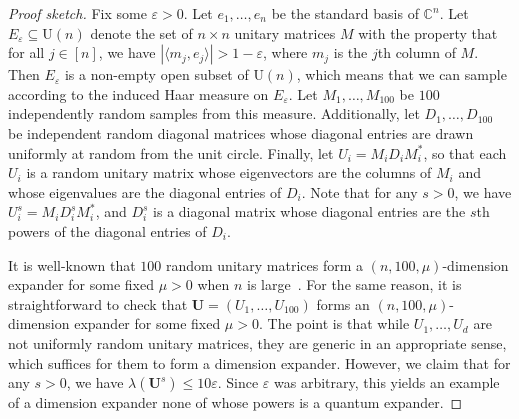 \documentclass[11pt]{article}
\theoremstyle{plain}
\numberwithin{equation}{section}
\theoremstyle{definition}
\newcommand{\bC}{\mathbb{C}}
\newcommand{\ab}[1]{\left\lvert#1\right\rvert}
\newcommand{\tuple}[1]{\mathbf{#1}}
\newcommand{\vU}{\tuple{U}}
\begin{document}
\begin{proof}[Proof sketch]
Fix some $\varepsilon>0$. Let $e_1,\dots,e_n$ be the standard basis of $\bC^n$. Let $E_\varepsilon \subseteq \mathrm U(n)$ denote the set of $n\times n$ unitary matrices $M$ with the property that for all $j\in[n]$, we have $\ab{\langle m_j,e_j\rangle}> 1- \varepsilon$, where $m_j$ is the $j$th column of $M$. Then $E_\varepsilon$ is a non-empty open subset of $\mathrm U(n)$, which means that we can sample according to the induced Haar measure on $E_\varepsilon$. Let $M_1,\dots,M_{100}$ be $100$ independently random samples from this measure. Additionally, let $D_1,\dots,D_{100}$ be independent random diagonal matrices whose diagonal entries are drawn uniformly at random from the unit circle. Finally, let $U_i = M_i D_i M_i^*$, so that each $U_i$ is a random unitary matrix whose eigenvectors are the columns of $M_i$ and whose eigenvalues are the diagonal entries of $D_i$. Note that for any $s>0$, we have $U_i^s = M_i D_i^s M_i^*$, and $D_i^s$ is a diagonal matrix whose diagonal entries are the $s$th powers of the diagonal entries of $D_i$.

It is well-known that $100$ random unitary matrices form a $(n,100,\mu)$-dimension expander for some fixed $\mu>0$ when $n$ is large~\cite{DS09}. For the same reason, it is straightforward to check that $\vU=(U_1,\dots,U_{100})$ forms an $(n,100,\mu)$-dimension expander for some fixed $\mu>0$. The point is that while $U_1,\dots,U_d$ are not uniformly random unitary matrices, they are 
%
generic
%
in an appropriate sense, which suffices for them to form a dimension expander. However, we claim that for any $s>0$, we have $\lambda(\vU^s)\leq 10 \varepsilon$. Since $\varepsilon$ was arbitrary, this yields an example of a dimension expander none of whose powers is a quantum expander. 


\end{proof}
\end{document}
